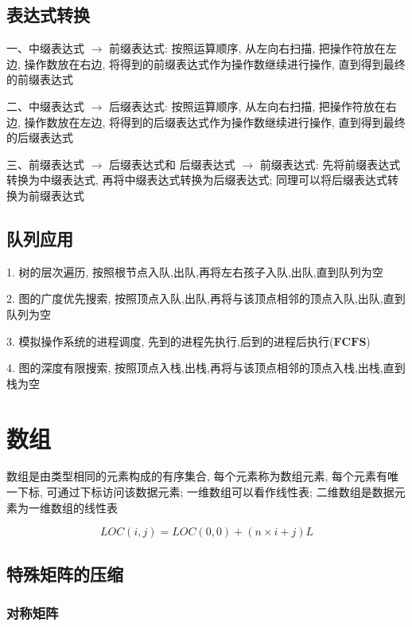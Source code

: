 \subsection{表达式转换}
\begin{theorem}[表达式转换: 手算]
    一、中缀表达式 $\to$ 前缀表达式: 按照运算顺序, 从左向右扫描, 把操作符放在左边, 操作数放在右边, 将得到的前缀表达式作为操作数继续进行操作, 直到得到最终的前缀表达式

    二、中缀表达式 $\to$ 后缀表达式: 按照运算顺序, 从左向右扫描, 把操作符放在右边, 操作数放在左边, 将得到的后缀表达式作为操作数继续进行操作, 直到得到最终的后缀表达式

    三、前缀表达式 $\to$ 后缀表达式和 后缀表达式 $\to$ 前缀表达式: 先将前缀表达式转换为中缀表达式, 再将中缀表达式转换为后缀表达式; 同理可以将后缀表达式转换为前缀表达式

\end{theorem}
\subsection{队列应用}
\begin{definition}[队列应用]
    1. 树的层次遍历, 按照根节点入队,出队,再将左右孩子入队,出队,直到队列为空

    2. 图的广度优先搜索, 按照顶点入队,出队,再将与该顶点相邻的顶点入队,出队,直到队列为空

    3. 模拟操作系统的进程调度, 先到的进程先执行,后到的进程后执行($\mathbf{FCFS}$)

    4. 图的深度有限搜索, 按照顶点入栈,出栈,再将与该顶点相邻的顶点入栈,出栈,直到栈为空
\end{definition}

\section{数组}
\begin{definition}[数组]
    数组是由类型相同的元素构成的有序集合, 每个元素称为数组元素, 每个元素有唯一下标, 可通过下标访问该数据元素; 
    一维数组可以看作线性表; 二维数组是数据元素为一维数组的线性表
\end{definition}
$$LOC(i,j) = LOC(0,0) + (n\times i + j)L$$

\subsection{特殊矩阵的压缩}
\subsubsection{对称矩阵}


